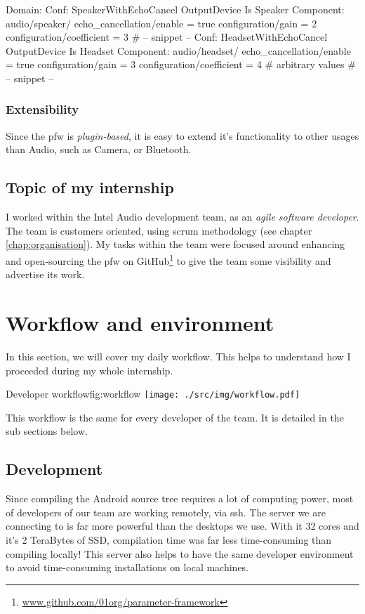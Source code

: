 \begin{code}[language=pfwLang, caption=Settings file example, label=lst:pfwsettings]
Domain:
    Conf: SpeakerWithEchoCancel
        OutputDevice Is Speaker
        Component: audio/speaker/
            echo_cancellation/enable = true
            configuration/gain = 2
            configuration/coefficient = 3
        # -- snippet --
    Conf: HeadsetWithEchoCancel
        OutputDevice Is Headset
        Component: audio/headset/
            echo_cancellation/enable = true
            configuration/gain = 3
            configuration/coefficient = 4 # arbitrary values
        # -- snippet --
\end{code}

\subsubsection{Extensibility}
Since the \gls{pfw} is \emph{plugin-based}, it is easy to extend it's functionality to other usages than Audio, such
as Camera, or Bluetooth.


\subsection{Topic of my internship}
I worked within the Intel Audio development team, as an \emph{agile
software developer}. The team is customers oriented, using \gls{scrum}
methodology (see chapter \ref{chap:organisation}). My tasks
within the team were focused around enhancing and open-sourcing the \gls{pfw} on
\gls{GitHub}\footnote{\url{www.github.com/01org/parameter-framework}} to give the team some
visibility and advertise its work.

\section{Workflow and environment}
In this section, we will cover my daily workflow. This helps
to understand how I proceeded during my whole internship.

\begin{figureGraphics}{Developer workflow}{fig:workflow}
    \texttt{[image: ./src/img/workflow.pdf]}
\end{figureGraphics}

This workflow is the same for every developer of the team. It is
detailed in the sub sections below.

\subsection{Development}
Since compiling the Android source tree requires a lot of computing power,
most of developers of our team are working remotely, via ssh.
The server we are connecting to is far more powerful than the desktops we use.
With it 32 cores and it's 2 TeraBytes of SSD, compilation time was far less time-consuming
than compiling locally!
This server also helps to have the same developer environment to avoid
time-consuming installations on local machines.

